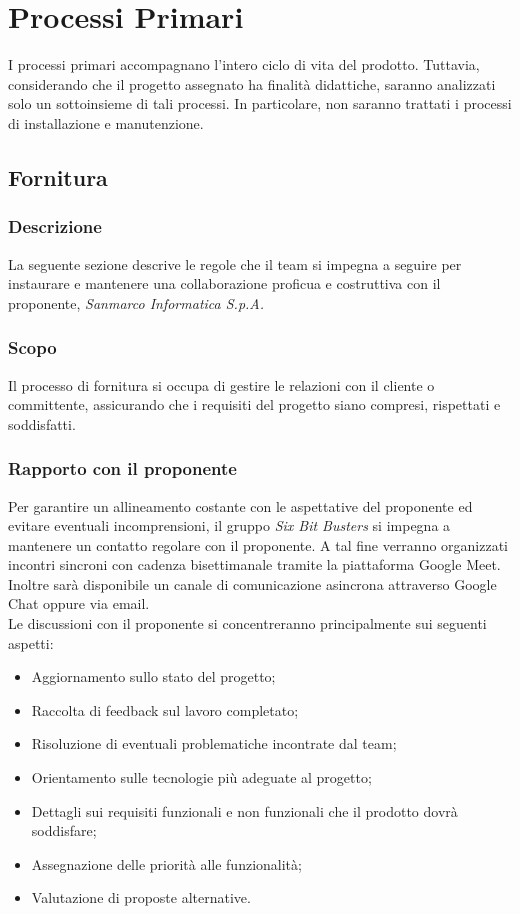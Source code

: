 \section{Processi Primari}
I processi primari accompagnano l'intero ciclo di vita del prodotto. 
Tuttavia, considerando che il progetto assegnato ha finalità didattiche, saranno analizzati solo un sottoinsieme di tali processi. 
In particolare, non saranno trattati i processi di installazione e manutenzione.

\subsection{Fornitura}
\subsubsection{Descrizione}
La seguente sezione descrive le regole che il team si impegna a seguire per
instaurare e mantenere una collaborazione proficua e costruttiva con il
proponente, \textit{Sanmarco Informatica S.p.A.}

\subsubsection{Scopo}
Il processo di fornitura si occupa di gestire le
relazioni con il cliente o committente, assicurando che i requisiti del
progetto siano compresi, rispettati e soddisfatti.

\subsubsection{Rapporto con il proponente}
Per garantire un allineamento costante con le aspettative del proponente ed
evitare eventuali incomprensioni, il gruppo \textit{Six Bit Busters} si impegna
a mantenere un contatto regolare con il proponente. A tal fine verranno
organizzati incontri sincroni con cadenza bisettimanale tramite la piattaforma
Google Meet. Inoltre sarà disponibile un canale di comunicazione asincrona
attraverso Google Chat oppure via email.\\

Le discussioni con il proponente si concentreranno principalmente sui seguenti
aspetti:

\begin{itemize}
    \item Aggiornamento sullo stato del progetto;
    \item Raccolta di feedback sul lavoro completato;
    \item Risoluzione di eventuali problematiche incontrate dal team;
    \item Orientamento sulle tecnologie più adeguate al progetto;
    \item Dettagli sui requisiti funzionali e non funzionali che il prodotto dovrà
          soddisfare;
    \item Assegnazione delle priorità alle funzionalità;
    \item Valutazione di proposte alternative.
\end{itemize}

